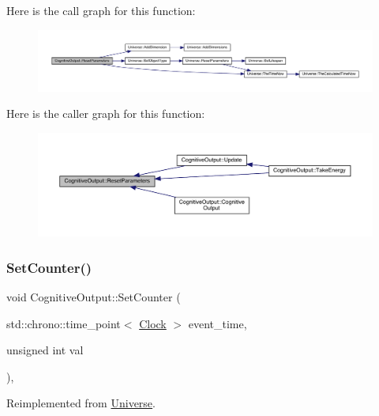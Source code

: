 Here is the call graph for this function\+:
\nopagebreak
\begin{figure}[H]
\begin{center}
\leavevmode
\includegraphics[width=350pt]{class_cognitive_output_ab43b79aaadf75d18512c4379a77542cd_cgraph}
\end{center}
\end{figure}
Here is the caller graph for this function\+:
\nopagebreak
\begin{figure}[H]
\begin{center}
\leavevmode
\includegraphics[width=350pt]{class_cognitive_output_ab43b79aaadf75d18512c4379a77542cd_icgraph}
\end{center}
\end{figure}
\mbox{\label{class_cognitive_output_a087e8bdab9eb6020dbbe6d47f524c8b6}} 
\subsubsection{\texorpdfstring{Set\+Counter()}{SetCounter()}}
{\footnotesize\ttfamily void Cognitive\+Output\+::\+Set\+Counter (\begin{DoxyParamCaption}\item[{std\+::chrono\+::time\+\_\+point$<$ \hyperlink{universe_8h_a0ef8d951d1ca5ab3cfaf7ab4c7a6fd80}{Clock} $>$}]{event\+\_\+time,  }\item[{unsigned int}]{val }\end{DoxyParamCaption})\hspace{0.3cm}{\ttfamily [inline]}, {\ttfamily [virtual]}}



Reimplemented from \hyperlink{class_universe_aa22202ae740eb1355529afcb13285e91}{Universe}.



